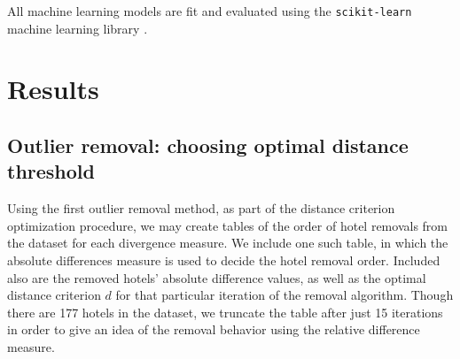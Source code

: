 \documentclass[useAMS, usenatbib]{biom}
\begin{document}
All machine learning models are fit and evaluated using the \texttt{scikit-learn} machine learning library \citep{scikit-learn}.

\section{Results}
\label{s:results}

\subsection{Outlier removal: choosing optimal distance threshold}
\label{ss:optimization}

Using the first outlier removal method, as part of the distance criterion optimization procedure, we may create tables of the order of hotel removals from the dataset for each divergence measure. We include one such table, in which the absolute differences measure is used to decide the hotel removal order. Included also are the removed hotels' absolute difference values, as well as the optimal distance criterion $d$ for that particular iteration of the removal algorithm. Though there are 177 hotels in the dataset, we truncate the table after just 15 iterations in order to give an idea of the removal behavior using the relative difference measure.
\end{document}

